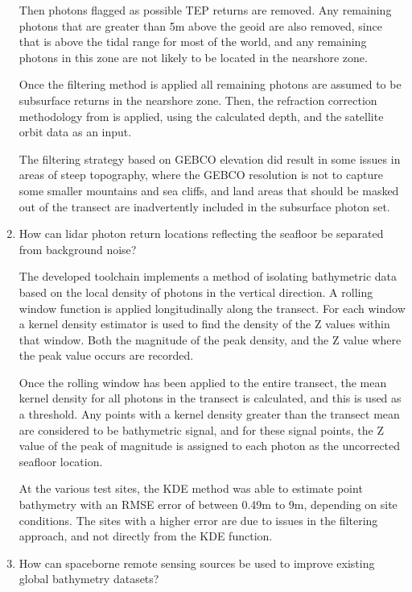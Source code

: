 \begin{enumerate}
    Then photons flagged as possible TEP returns  are removed. Any remaining photons that are greater than 5m above the geoid are also removed, since that is above the tidal range for most of the world, and any remaining photons in this zone are not likely to be located in the nearshore zone. 

    Once the filtering method is applied all remaining photons are assumed to be subsurface returns in the nearshore zone. Then, the refraction correction methodology from \citeauthor{Parrish2019} is applied, using the calculated depth, and the satellite orbit data as an input. 

    The filtering strategy based on GEBCO elevation did result in some issues in areas of steep topography, where the GEBCO resolution is not to capture some smaller mountains and sea cliffs, and land areas that should be masked out of the transect are inadvertently included in the subsurface photon set.

    \item How can lidar photon return locations reflecting the seafloor be separated from background noise?
    
    The developed toolchain implements a method of isolating bathymetric data based on the local density of photons in the vertical direction. A rolling window function is applied longitudinally along the transect. For each window a kernel density estimator is used to find the density of the Z values within that window. Both the magnitude of the peak density, and the Z value where the peak value occurs are recorded.    

    Once the rolling window has been applied to the entire transect, the mean kernel density for all photons in the transect is calculated, and this is used as a threshold. Any points with a kernel density greater than the transect mean are considered to be bathymetric signal, and for these signal points, the Z value of the peak of magnitude is assigned to each photon as the uncorrected seafloor location. 

    At the various test sites, the KDE method was able to estimate point bathymetry with an RMSE error of between 0.49m to 9m, depending on site conditions. The sites with a higher error are due to issues in the filtering approach, and not directly from the KDE function.

    \item How can spaceborne remote sensing sources be used to improve existing global bathymetry datasets?
    

\end{enumerate}
